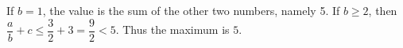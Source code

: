 If $ b=1 $, the value is the sum of the other two numbers, namely 5. If $ b\ge2 $, then $\dfrac{a}{b}+c\le\dfrac{3}{2}+3=\dfrac{9}{2}<5 $. Thus the maximum is $\boxed5 $.
